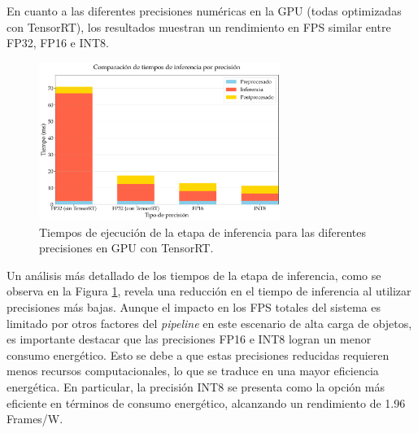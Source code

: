 \documentclass[11pt,spanish,listoffigures,listoftables]{tfgetsinf}
\begin{document}
En cuanto a las diferentes precisiones numéricas en la GPU (todas optimizadas con TensorRT), los resultados muestran un rendimiento en FPS similar entre FP32, FP16 e INT8.
\begin{figure}[H]
   \centering
   \includegraphics[width=0.7\textwidth]{excels/inferencia/precision_device/tiempos_inferencia_device/tiempos_inferencia_device.pdf}
   \caption[Tiempos de ejecución de la etapa de inferencia para las diferentes precisiones en GPU con TensorRT]{Tiempos de ejecución de la etapa de inferencia para las diferentes precisiones en GPU con TensorRT.}
   \label{fig:tiempos_inferencia_gpu}
\end{figure}
Un análisis más detallado de los tiempos de la etapa de inferencia, como se observa en la Figura \ref{fig:tiempos_inferencia_gpu}, revela una reducción en el tiempo de inferencia al utilizar precisiones más bajas. Aunque el impacto en los FPS totales del sistema es limitado por otros factores del \textit{pipeline} en este escenario de alta carga de objetos, es importante destacar que las precisiones FP16 e INT8 logran un menor consumo energético. Esto se debe a que estas precisiones reducidas requieren menos recursos computacionales, lo que se traduce en una mayor eficiencia energética. En particular, la precisión INT8 se presenta como la opción más eficiente en términos de consumo energético, alcanzando un rendimiento de 1.96 Frames/W.
\end{document}

